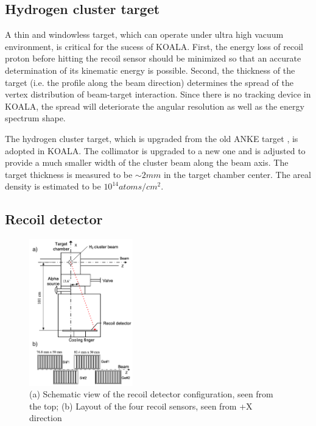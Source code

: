 \documentclass[number,5p]{elsarticle}
\begin{document}
\subsection{Hydrogen cluster target}
\label{sec:target}

A thin and windowless target, which can operate under ultra high vacuum
environment, is critical for the sucess of KOALA.
First, the energy loss of recoil proton before hitting the recoil sensor should
be minimized so that an accurate determination of its kinematic energy is possible.
Second, the thickness of the target (i.e. the profile along the beam direction) determines
the spread of the vertex distribution of beam-target interaction.
Since there is no tracking device in KOALA, the spread will deteriorate the
angular resolution as well as the energy spectrum shape.

The hydrogen cluster target, which is upgraded from the old ANKE target \cite{cluster_target}, is adopted in KOALA.
The collimator is upgraded to a new one and is adjusted to provide a much
smaller width of the cluster beam along the beam axis.
The target thickness is measured to be $\sim2 mm$ in the target chamber center.
The areal density is estimated to be $10^{14} atoms/cm^2$.

\subsection{Recoil detector}
\label{sec:recoil}

\begin{figure}[htbp]
\centering
\includegraphics[width=0.4\textwidth]{./recoil_schematic.png}
\caption{(a) Schematic view of the recoil detector configuration, seen from the
  top; (b) Layout of the four recoil sensors, seen from +X direction}
\label{fig:recoil_schematic}
\end{figure}
\end{document}
